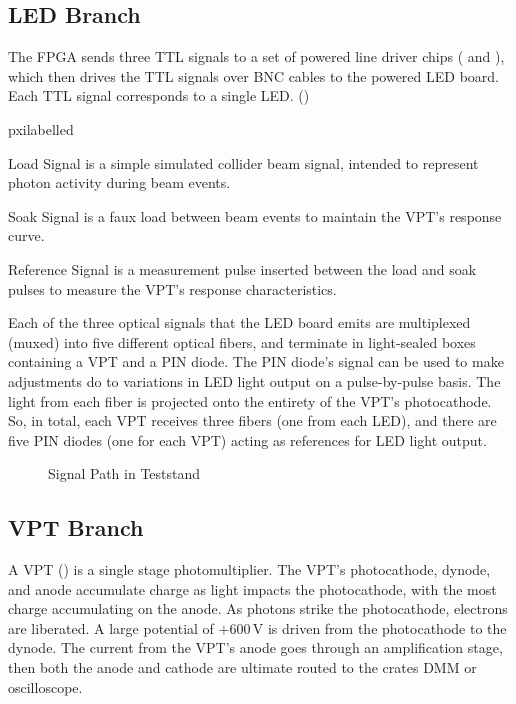\subsection{LED Branch}
\label{sec:eq_intro:led_branch}

The FPGA sends three TTL signals to a set of powered line driver chips ( and ), which then drives the TTL signals over BNC cables to the powered LED board.  Each TTL signal corresponds to a single LED. ()

\begin{labelled}{pxilabelled}
\item [Load Signal] is a simple simulated collider beam signal, intended to represent photon activity during beam events.
\item [Soak Signal] is a faux load between beam events to maintain the VPT's response curve.
\item [Reference Signal] is a measurement pulse inserted between the load and soak pulses to measure the VPT's response characteristics.
\end{labelled}

Each of the three optical signals that the LED board emits are multiplexed (muxed) into five different optical fibers, and terminate in light-sealed boxes containing a VPT and a PIN diode.  The PIN diode's signal can be used to make adjustments do to variations in LED light output on a pulse-by-pulse basis.  The light from each fiber is projected onto the entirety of the VPT's photocathode.  So, in total, each VPT receives three fibers (one from each LED), and there are five PIN diodes (one for each VPT) acting as references for LED light output.  


\begin{figure}[htbp]
  \centering
  
  \caption{Signal Path in Teststand}
  \label{fig:eq_intro:signal}
\end{figure}

\subsection{VPT Branch}
\label{sec:eq_intro:vpt_branch}
A VPT () is a single stage photomultiplier.  The VPT's photocathode, dynode, and anode accumulate charge as light impacts the photocathode, with the most charge accumulating on the anode.  As photons  strike the photocathode, electrons are liberated.  A large potential of $+600$\,V is driven from the photocathode to the dynode.  The current from the VPT's anode goes through an amplification stage, then both the anode and cathode are ultimate routed to the crates DMM or oscilloscope.

